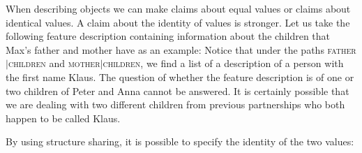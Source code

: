 When describing objects we can make claims about equal values or claims about identical values.
A claim about the identity of values is stronger. Let us take the following feature description containing
information about the children that Max's father and mother have as an example:
\ea
{}
\z
Notice that under the paths \textsc{father$|$children} and \textsc{mother$|$children}, we find a list of a description of a person with the first name Klaus.
The question of whether the feature description is of one or two children of Peter and Anna cannot be answered. It is certainly possible that we are
dealing with two different children from previous partnerships who both happen to be called
Klaus.

By using structure sharing, it is possible to specify the identity of the two values:

\ea
{}
\z

